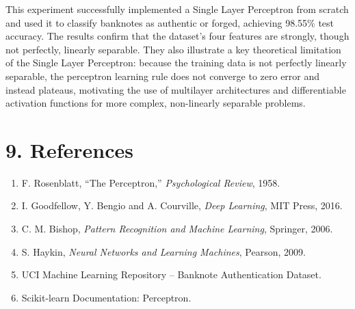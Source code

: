 \documentclass[11pt]{article}
\begin{document}
This experiment successfully implemented a Single Layer Perceptron from scratch and used it to classify banknotes as authentic or forged, achieving 98.55\% test accuracy. The results confirm that the dataset's four features are strongly, though not perfectly, linearly separable. They also illustrate a key theoretical limitation of the Single Layer Perceptron: because the training data is not perfectly linearly separable, the perceptron learning rule does not converge to zero error and instead plateaus, motivating the use of multilayer architectures and differentiable activation functions for more complex, non-linearly separable problems.


\section*{9. References}

\begin{enumerate}
\item F. Rosenblatt, ``The Perceptron,'' \emph{Psychological Review}, 1958.
\item I. Goodfellow, Y. Bengio and A. Courville, \emph{Deep Learning}, MIT Press, 2016.
\item C. M. Bishop, \emph{Pattern Recognition and Machine Learning}, Springer, 2006.
\item S. Haykin, \emph{Neural Networks and Learning Machines}, Pearson, 2009.
\item UCI Machine Learning Repository -- Banknote Authentication Dataset.
\item Scikit-learn Documentation: Perceptron.
\end{enumerate}
\end{document}
